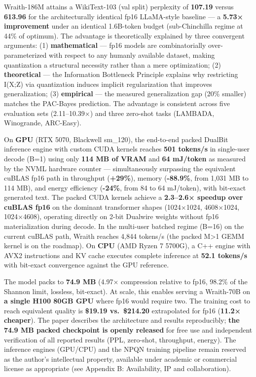 Wraith-186M attains a WikiText-103 (val split) perplexity of
\textbf{107.19} versus \textbf{613.96} for the architecturally identical
fp16 LLaMA-style baseline --- a \textbf{5.73× improvement} under an
identical 1.6B-token budget (sub-Chinchilla regime at 44\% of optimum).
The advantage is theoretically explained by three convergent arguments:
(1) \textbf{mathematical} --- fp16 models are combinatorially
over-parameterized with respect to any humanly available dataset, making
quantization a structural necessity rather than a mere optimization; (2)
\textbf{theoretical} --- the Information Bottleneck Principle explains
why restricting I(X;Z) via quantization induces implicit regularization
that improves generalization; (3) \textbf{empirical} --- the measured
generalization gap (20\% smaller) matches the PAC-Bayes prediction. The
advantage is consistent across five evaluation sets (2.11--10.39×) and
three zero-shot tasks (LAMBADA, Winogrande, ARC-Easy).

On \textbf{GPU} (RTX 5070, Blackwell sm\_120), the end-to-end packed
DualBit inference engine with custom CUDA kernels reaches \textbf{501
tokens/s} in single-user decode (B=1) using only \textbf{114 MB of VRAM}
and \textbf{64 mJ/token} as measured by the NVML hardware counter ---
simultaneously surpassing the equivalent cuBLAS fp16 path in throughput
(\textbf{+29\%}), memory (\textbf{-88.9\%}, from 1,031 MB to 114 MB),
and energy efficiency (\textbf{-24\%}, from 84 to 64 mJ/token), with
bit-exact generated text. The packed CUDA kernels achieve a
\textbf{2.3--2.6× speedup over cuBLAS fp16} on the dominant transformer
shapes (1024×1024, 4608×1024, 1024×4608), operating directly on 2-bit
Dualwire weights without fp16 materialization during decode. In the
multi-user batched regime (B=16) on the current cuBLAS path, Wraith
reaches 4,844 tokens/s (the packed M\textgreater1 GEMM kernel is on the
roadmap). On \textbf{CPU} (AMD Ryzen 7 5700G), a C++ engine with AVX2
instructions and KV cache executes complete inference at \textbf{52.1
tokens/s} with bit-exact convergence against the GPU reference.

The model packs to \textbf{74.9 MB} (4.97× compression relative to fp16,
98.2\% of the Shannon limit, lossless, bit-exact). At scale, this
enables serving a Wraith-70B on \textbf{a single H100 80GB GPU} where
fp16 would require two. The training cost to reach equivalent quality is
\textbf{\$19.19 vs.~\$214.20} extrapolated for fp16 (\textbf{11.2×
cheaper}). The paper describes the architecture and results
reproducibly; \textbf{the 74.9 MB packed checkpoint is openly released}
for free use and independent verification of all reported results (PPL,
zero-shot, throughput, energy). The inference engines (GPU/CPU) and the
NPQN training pipeline remain reserved as the author's intellectual
property, available under academic or commercial license as appropriate
(see Appendix B: Availability, IP and collaboration).

